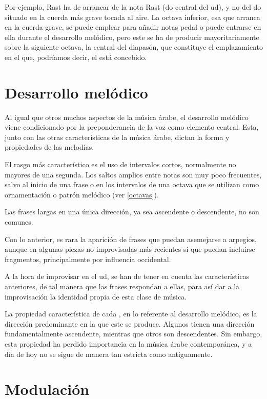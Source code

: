 Por ejemplo, \maqam Rast ha de arrancar de la nota Rast (do central del ud), y no del do situado en la cuerda más grave tocada al aire. La octava inferior, esa que arranca en la cuerda grave, se puede emplear para añadir notas pedal o puede entrarse en ella durante el desarrollo melódico, pero este se ha de producir mayoritariamente sobre la siguiente octava, la central del diapasón, que constituye el emplazamiento en el que, podríamos decir, el \maqam está concebido.

\section{Desarrollo melódico}
\label{desarrollo_melodico}

Al igual que otros muchos aspectos de la música árabe, el desarrollo melódico viene condicionado por la preponderancia de la voz como elemento central. Esta, junto con las otras características de la música árabe, dictan la forma y propiedades de las melodías.

El rasgo más característico es el uso de intervalos cortos, normalmente no mayores de una segunda. Los saltos amplios entre notas son muy poco frecuentes, salvo al inicio de una frase o en los intervalos de una octava que se utilizan como ornamentación o patrón melódico (ver \ref{octavas}).

Las frases largas en una única dirección, ya sea ascendente o descendente, no son comunes.

Con lo anterior, es rara la aparición de frases que puedan asemejarse a arpegios, aunque en algunas piezas no improvisadas más recientes sí que puedan incluirse fragmentos, principalmente por influencia occidental.

A la hora de improvisar en el ud, se han de tener en cuenta las características anteriores, de tal manera que las frases respondan a ellas, para así dar a la improvisación la identidad propia de esta clase de música.

La propiedad característica de cada \maqamb, en lo referente al desarrollo melódico, es la dirección predominante en la que este se produce. Algunos \maqamaat tienen una dirección fundamentalmente ascendente, mientras que otros son descendentes. Sin embargo, esta propiedad ha perdido importancia en la música árabe contemporánea, y a día de hoy no se sigue de manera tan estricta como antiguamente.

\section{Modulación}
\label{modulacion}

